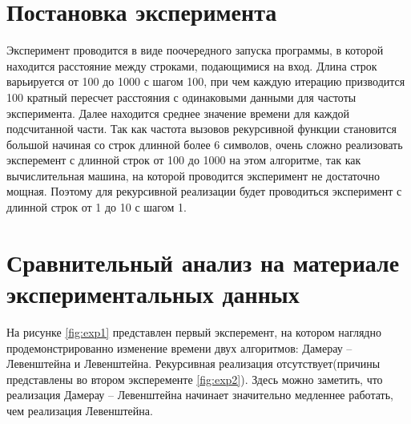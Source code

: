 \section{ Постановка эксперимента}
Эксперимент проводится в виде поочередного запуска программы, в которой находится расстояние между строками, подающимися на вход. Длина строк варьируется от 100 до 1000 с шагом 100, при чем каждую итерацию призводится 100 кратный пересчет расстояния с одинаковыми данными для частоты эксперимента. Далее находится среднее значение времени для каждой подсчитанной части. Так как частота вызовов рекурсивной функции становится большой начиная со строк длинной более 6 символов, очень сложно реализовать эксперемент с длинной строк от 100 до 1000 на этом алгоритме, так как вычислительная машина, на которой проводится эксперимент не достаточно мощная. Поэтому для рекурсивной реализации будет проводиться эксперимент с длинной строк от 1 до 10 с шагом 1. 

\section{ Сравнительный анализ на материале экспериментальных данных}

На рисунке \ref{fig:exp1} представлен первый эксперемент, на котором наглядно продемонстрированно изменение времени двух алгоритмов: Дамерау -- Левенштейна и Левенштейна. Рекурсивная реализация отсутствует(причины представлены во втором эксперементе \ref{fig:exp2}). Здесь можно заметить, что реализация Дамерау -- Левенштейна начинает значительно медленнее работать, чем реализация Левенштейна. 

\begin{figure}[ht!]
\end{figure}

